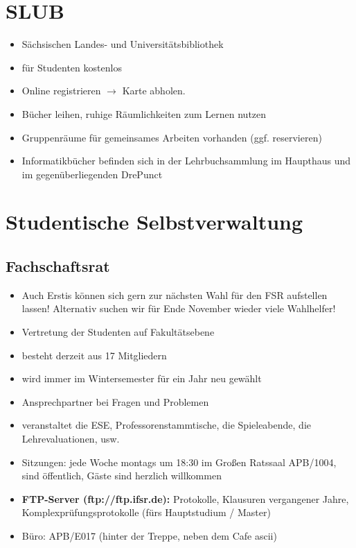 \documentclass[a4paper,12pt]{report}
\begin{document}
\section{SLUB}
\begin{itemize}
	\item Sächsischen Landes- und Universitätsbibliothek
	\item für Studenten kostenlos
	\item Online registrieren $\rightarrow$ Karte abholen.
	\item Bücher leihen, ruhige Räumlichkeiten zum Lernen nutzen
	\item Gruppenräume für gemeinsames Arbeiten vorhanden (ggf. reservieren)
	\item Informatikbücher befinden sich in der Lehrbuchsammlung im Haupthaus und im gegenüberliegenden \glqq DrePunct\grqq
\end{itemize}

\section{Studentische Selbstverwaltung}

\subsection{Fachschaftsrat}
\begin{itemize}
	\item Auch Erstis können sich gern zur nächsten Wahl für den FSR aufstellen lassen! Alternativ suchen wir für Ende November wieder viele Wahlhelfer!
	\item Vertretung der Studenten auf Fakultätsebene
	\item besteht derzeit aus 17 Mitgliedern
	\item wird immer im Wintersemester für ein Jahr neu gewählt
	\item Ansprechpartner bei Fragen und Problemen
	\item veranstaltet die ESE, Professorenstammtische, die Spieleabende, die Lehrevaluationen, usw.
	\item Sitzungen: jede Woche montags um 18:30 im Großen Ratssaal APB/1004, sind öffentlich, Gäste sind herzlich willkommen
	\item \textbf{FTP-Server (ftp://ftp.ifsr.de):} Protokolle, Klausuren vergangener Jahre, Komplexprüfungsprotokolle (fürs Hauptstudium / Master)
	\item Büro: APB/E017 (hinter der Treppe, neben dem Cafe ascii)	
\end{itemize}
\end{document}
